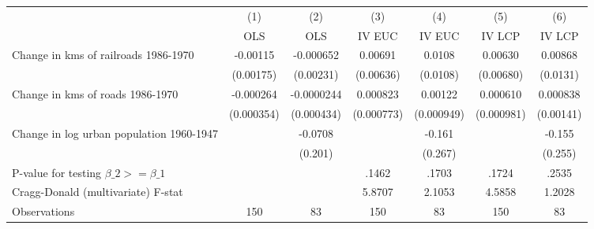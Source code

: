 {
\def\sym#1{\ifmmode^{#1}\else\(^{#1}\)\fi}
\begin{tabular}{l*{6}{c}}
\hline\hline
                &\multicolumn{1}{c}{(1)}&\multicolumn{1}{c}{(2)}&\multicolumn{1}{c}{(3)}&\multicolumn{1}{c}{(4)}&\multicolumn{1}{c}{(5)}&\multicolumn{1}{c}{(6)}\\
                &\multicolumn{1}{c}{OLS}&\multicolumn{1}{c}{OLS}&\multicolumn{1}{c}{IV EUC}&\multicolumn{1}{c}{IV EUC}&\multicolumn{1}{c}{IV LCP}&\multicolumn{1}{c}{IV LCP}\\
\hline
Change in kms of railroads 1986-1970& -0.00115         &-0.000652         &  0.00691         &   0.0108         &  0.00630         &  0.00868         \\
                &(0.00175)         &(0.00231)         &(0.00636)         & (0.0108)         &(0.00680)         & (0.0131)         \\
[1em]
Change in kms of roads 1986-1970&-0.000264         &-0.0000244         & 0.000823         &  0.00122         & 0.000610         & 0.000838         \\
                &(0.000354)         &(0.000434)         &(0.000773)         &(0.000949)         &(0.000981)         &(0.00141)         \\
[1em]
Change in log urban population 1960-1947&                  &  -0.0708         &                  &   -0.161         &                  &   -0.155         \\
                &                  &  (0.201)         &                  &  (0.267)         &                  &  (0.255)         \\
\hline
P-value for testing $\beta\_{2} >= \beta\_{1}$&                  &                  &    .1462         &    .1703         &    .1724         &    .2535         \\
Cragg-Donald (multivariate) F-stat&                  &                  &   5.8707         &   2.1053         &   4.5858         &   1.2028         \\
Observations    &      150         &       83         &      150         &       83         &      150         &       83         \\
\hline\hline
\end{tabular}
}
